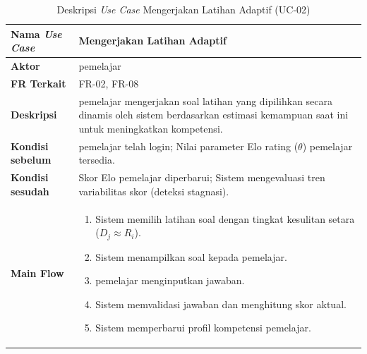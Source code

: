 \begin{table}[H]
    \centering
    \caption{Deskripsi \textit{Use Case} Mengerjakan Latihan Adaptif (UC-02)}
    \label{tbl:desc_uc02}
    \begin{tabular}{|p{}|p{}|}
        \hline
        \textbf{Nama \textit{Use Case}} & \textbf{Mengerjakan Latihan Adaptif} \\
        \hline
        \textbf{Aktor} & pemelajar \\
        \hline
        \textbf{FR Terkait} & FR-02, FR-08 \\
        \hline
        \textbf{Deskripsi} & pemelajar mengerjakan soal latihan yang dipilihkan secara dinamis oleh sistem berdasarkan estimasi kemampuan saat ini untuk meningkatkan kompetensi. \\
        \hline
        \textbf{Kondisi sebelum} & pemelajar telah login; Nilai parameter Elo rating ($\theta$) pemelajar tersedia. \\
        \hline
        \textbf{Kondisi sesudah} & Skor Elo pemelajar diperbarui; Sistem mengevaluasi tren variabilitas skor (deteksi stagnasi). \\
        \hline
        \textbf{Main Flow} & \begin{enumerate}[noitemsep,topsep=0pt,leftmargin=*]
            \item Sistem memilih latihan soal dengan tingkat kesulitan setara ($D_j \approx R_i$).
            \item Sistem menampilkan soal kepada pemelajar.
            \item pemelajar menginputkan jawaban.
            \item Sistem memvalidasi jawaban dan menghitung skor aktual.
            \item Sistem memperbarui profil kompetensi pemelajar.
        \end{enumerate} \\
        \hline
    \end{tabular}
\end{table}